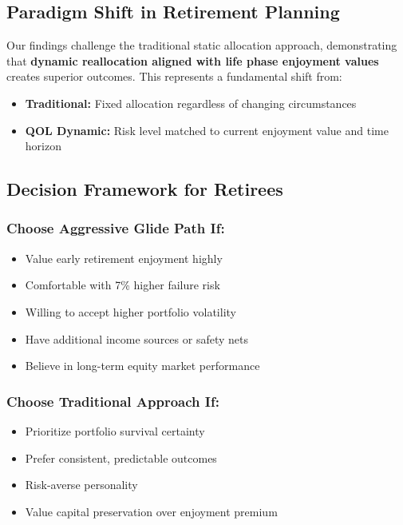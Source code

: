 \documentclass[11pt,letterpaper]{article}
\begin{document}
\subsection{Paradigm Shift in Retirement Planning}

Our findings challenge the traditional static allocation approach, demonstrating that \textbf{dynamic reallocation aligned with life phase enjoyment values} creates superior outcomes. This represents a fundamental shift from:

\begin{itemize}[leftmargin=*]
    \item \textbf{Traditional:} Fixed allocation regardless of changing circumstances
    \item \textbf{QOL Dynamic:} Risk level matched to current enjoyment value and time horizon
\end{itemize}

\subsection{Decision Framework for Retirees}

\subsubsection{Choose Aggressive Glide Path If:}
\begin{itemize}[leftmargin=*]
    \item Value early retirement enjoyment highly
    \item Comfortable with 7\% higher failure risk
    \item Willing to accept higher portfolio volatility  
    \item Have additional income sources or safety nets
    \item Believe in long-term equity market performance
\end{itemize}

\subsubsection{Choose Traditional Approach If:}
\begin{itemize}[leftmargin=*]
    \item Prioritize portfolio survival certainty
    \item Prefer consistent, predictable outcomes
    \item Risk-averse personality
    \item Value capital preservation over enjoyment premium
\end{itemize}
\end{document}
